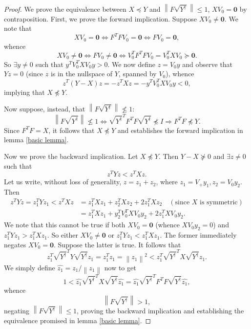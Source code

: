 \documentclass[11pt]{article}
\newcommand{\norm}[1]{\left\|#1\right\|}
\newcommand{\Leq}{\preceq}
\newcommand{\Geq}{\succeq}
\newcommand{\0}{\ensuremath{\mathbf{0}}}
\renewcommand{\>}{\succ}
\newcommand{\<}{\prec}
\begin{document}
\begin{proof}
We prove the equivalence between $X \Leq Y$ and $\norm{F \sqrt{Y^{\dagger}} } \leq 1$, $X V_0 = \mathbf{0}$ by contraposition. First, we prove the forward implication. Suppose $X V_0 \neq \mathbf{0}$. We note that 
\[ XV_0 = \mathbf{0} \Leftrightarrow F^T F V_0 = \mathbf{0} \Leftrightarrow FV_0 = \mathbf{0}, \]
whence
\[ XV_0 \neq \mathbf{0} \Leftrightarrow FV_0 \neq \mathbf{0} \Leftrightarrow V_0 ^T F^T F V_0 = V_0 ^T X V_0 \Geq \mathbf{0}. \]
So $\exists y \neq 0$ such that $y^T V_0 ^T X V_0 y > 0$. We now define $z = V_0 y$ and observe that $Y z = 0$ (since $z$ is in the nullspace of $Y$, spanned by $V_0$), whence
\[ z^T (Y - X) z = - z^T X z = - y^T V_0 ^T X V_0 y  < 0, \]
implying that $X \not \Leq Y$.

\noindent Now suppose, instead, that $\norm{F \sqrt{Y^{\dagger}}} \not \leq 1$:
\[ \norm{F \sqrt{Y^{\dagger}} } \not \leq 1 \Leftrightarrow \sqrt{Y^{\dagger}} ^T F^T F \sqrt{Y^{\dagger}} \not \Leq I  \Rightarrow F^T F \not \Leq Y. \]
Since $F^T F = X$, it follows that $X \not \Leq Y$ and establishes the forward implication in lemma \ref{basic lemma}.

\noindent Now we prove the backward implication. Let $X \not \Leq Y$. Then $Y - X \not \Geq 0$ and $\exists z \neq 0$ such that
\[ z^T Y z < z^T X z. \]
Let us write, without loss of generality, $z = z_1 + z_2$, where $z_1 = V_+ y_1, z_2 = V_0 y_2$. Then 
\begin{align*}
z^T Y z = z_1 ^T Y z_1 < z^T X z &= z_1 ^T X z_1 + z_2 ^T X z_2 + 2 z_1 ^T X z_2 \quad (\text{since }X \text{ is symmetric})\\
&= z_1 ^T X z_1 + y_2 ^T V_0 ^T X V_0 y_2 + 2 z_1 ^T X V_0 y_2.
\end{align*}
We note that this cannot be true if both $XV_0 = \0$ (whence $X V_0 y_2 = 0$) and $z_1 ^T Y z_1 > z_1 ^T X z_1$. So either $XV_0 \neq \0$ or $z_1 ^T Y z_1 < z_1 ^T X z_1$. The former immediately negates $XV_0 = \mathbf{0}$. Suppose the latter is true. It follows that
\[ z_1 ^T \sqrt{Y^{\dagger}}^T Y \sqrt{Y^{\dagger}} z_1 = z_1 ^T z_1 = \norm{z_1}^2 < z_1 ^T \sqrt{Y^{\dagger}}^T X \sqrt{Y^{\dagger}} z_1. \]
We simply define $\hat{z_1} = z_1 / \norm{z_1}$ now to get 
\[ 1 < \hat{z_1} \sqrt{Y^{\dagger}}^T X \sqrt{Y^{\dagger}} \hat{z_1} = \hat{z_1} \sqrt{Y^{\dagger}}^T F^T F \sqrt{Y^{\dagger}} \hat{z_1}, \]
whence
\[ \norm{F \sqrt{Y^{\dagger}}} > 1,\]
negating $\norm{F \sqrt{Y^{\dagger}}} \leq 1$, proving the backward implication and establishing the equivalence promised in lemma \ref{basic lemma}.
\end{proof}
\end{document}
